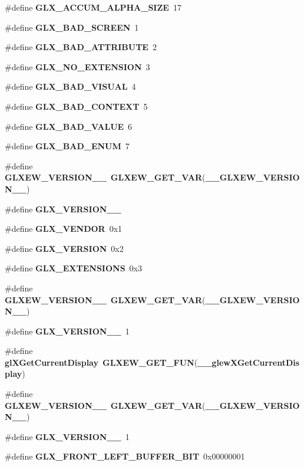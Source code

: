 \begin{DoxyCompactItemize}
\item 
\#define {\bf G\+L\+X\+\_\+\+A\+C\+C\+U\+M\+\_\+\+A\+L\+P\+H\+A\+\_\+\+S\+I\+ZE}~17
\item 
\#define {\bf G\+L\+X\+\_\+\+B\+A\+D\+\_\+\+S\+C\+R\+E\+EN}~1
\item 
\#define {\bf G\+L\+X\+\_\+\+B\+A\+D\+\_\+\+A\+T\+T\+R\+I\+B\+U\+TE}~2
\item 
\#define {\bf G\+L\+X\+\_\+\+N\+O\+\_\+\+E\+X\+T\+E\+N\+S\+I\+ON}~3
\item 
\#define {\bf G\+L\+X\+\_\+\+B\+A\+D\+\_\+\+V\+I\+S\+U\+AL}~4
\item 
\#define {\bf G\+L\+X\+\_\+\+B\+A\+D\+\_\+\+C\+O\+N\+T\+E\+XT}~5
\item 
\#define {\bf G\+L\+X\+\_\+\+B\+A\+D\+\_\+\+V\+A\+L\+UE}~6
\item 
\#define {\bf G\+L\+X\+\_\+\+B\+A\+D\+\_\+\+E\+N\+UM}~7
\item 
\#define {\bf G\+L\+X\+E\+W\+\_\+\+V\+E\+R\+S\+I\+O\+N\+\_\+\_}~{\bf G\+L\+X\+E\+W\+\_\+\+G\+E\+T\+\_\+\+V\+AR}({\bf \+\_\+\+\_\+\+G\+L\+X\+E\+W\+\_\+\+V\+E\+R\+S\+I\+O\+N\+\_\+\_})
\item 
\#define {\bf G\+L\+X\+\_\+\+V\+E\+R\+S\+I\+O\+N\+\_\+\_}
\item 
\#define {\bf G\+L\+X\+\_\+\+V\+E\+N\+D\+OR}~0x1
\item 
\#define {\bf G\+L\+X\+\_\+\+V\+E\+R\+S\+I\+ON}~0x2
\item 
\#define {\bf G\+L\+X\+\_\+\+E\+X\+T\+E\+N\+S\+I\+O\+NS}~0x3
\item 
\#define {\bf G\+L\+X\+E\+W\+\_\+\+V\+E\+R\+S\+I\+O\+N\+\_\+\_}~{\bf G\+L\+X\+E\+W\+\_\+\+G\+E\+T\+\_\+\+V\+AR}({\bf \+\_\+\+\_\+\+G\+L\+X\+E\+W\+\_\+\+V\+E\+R\+S\+I\+O\+N\+\_\+\_})
\item 
\#define {\bf G\+L\+X\+\_\+\+V\+E\+R\+S\+I\+O\+N\+\_\+\_}~1
\item 
\#define {\bf gl\+X\+Get\+Current\+Display}~{\bf G\+L\+X\+E\+W\+\_\+\+G\+E\+T\+\_\+\+F\+UN}({\bf \+\_\+\+\_\+glew\+X\+Get\+Current\+Display})
\item 
\#define {\bf G\+L\+X\+E\+W\+\_\+\+V\+E\+R\+S\+I\+O\+N\+\_\+\_}~{\bf G\+L\+X\+E\+W\+\_\+\+G\+E\+T\+\_\+\+V\+AR}({\bf \+\_\+\+\_\+\+G\+L\+X\+E\+W\+\_\+\+V\+E\+R\+S\+I\+O\+N\+\_\+\_})
\item 
\#define {\bf G\+L\+X\+\_\+\+V\+E\+R\+S\+I\+O\+N\+\_\+\_}~1
\item 
\#define {\bf G\+L\+X\+\_\+\+F\+R\+O\+N\+T\+\_\+\+L\+E\+F\+T\+\_\+\+B\+U\+F\+F\+E\+R\+\_\+\+B\+IT}~0x00000001

\end{DoxyCompactItemize}
